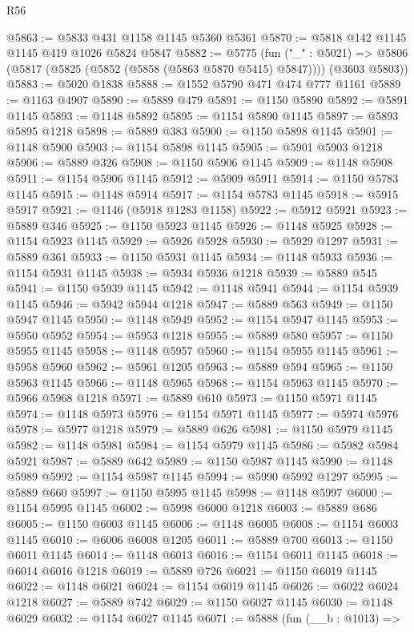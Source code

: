 \begin{lexlean}{R56}
\begin{coremodule}
@5863 := @5833 @431 @1158 @1145 @5360 @5361
@5870 := @5818 @142 @1145 @1145 @419 @1026 @5824 @5847
@5882 := @5775
    (fun ("_" : @5021) =>
    @5806 (@5817 (@5825 (@5852 (@5858 (@5863 @5870 @5415) @5847)))) (@3603 @5803))
@5883 := @5020 @1838
@5888 := @1552 @5790 @471 @474 @777 @1161
@5889 := @1163 @4907
@5890 := @5889 @479
@5891 := @1150 @5890
@5892 := @5891 @1145
@5893 := @1148 @5892
@5895 := @1154 @5890 @1145
@5897 := @5893 @5895 @1218
@5898 := @5889 @383
@5900 := @1150 @5898 @1145
@5901 := @1148 @5900
@5903 := @1154 @5898 @1145
@5905 := @5901 @5903 @1218
@5906 := @5889 @326
@5908 := @1150 @5906 @1145
@5909 := @1148 @5908
@5911 := @1154 @5906 @1145
@5912 := @5909 @5911
@5914 := @1150 @5783 @1145
@5915 := @1148 @5914
@5917 := @1154 @5783 @1145
@5918 := @5915 @5917
@5921 := @1146 (@5918 @1283 @1158)
@5922 := @5912 @5921
@5923 := @5889 @346
@5925 := @1150 @5923 @1145
@5926 := @1148 @5925
@5928 := @1154 @5923 @1145
@5929 := @5926 @5928
@5930 := @5929 @1297
@5931 := @5889 @361
@5933 := @1150 @5931 @1145
@5934 := @1148 @5933
@5936 := @1154 @5931 @1145
@5938 := @5934 @5936 @1218
@5939 := @5889 @545
@5941 := @1150 @5939 @1145
@5942 := @1148 @5941
@5944 := @1154 @5939 @1145
@5946 := @5942 @5944 @1218
@5947 := @5889 @563
@5949 := @1150 @5947 @1145
@5950 := @1148 @5949
@5952 := @1154 @5947 @1145
@5953 := @5950 @5952
@5954 := @5953 @1218
@5955 := @5889 @580
@5957 := @1150 @5955 @1145
@5958 := @1148 @5957
@5960 := @1154 @5955 @1145
@5961 := @5958 @5960
@5962 := @5961 @1205
@5963 := @5889 @594
@5965 := @1150 @5963 @1145
@5966 := @1148 @5965
@5968 := @1154 @5963 @1145
@5970 := @5966 @5968 @1218
@5971 := @5889 @610
@5973 := @1150 @5971 @1145
@5974 := @1148 @5973
@5976 := @1154 @5971 @1145
@5977 := @5974 @5976
@5978 := @5977 @1218
@5979 := @5889 @626
@5981 := @1150 @5979 @1145
@5982 := @1148 @5981
@5984 := @1154 @5979 @1145
@5986 := @5982 @5984 @5921
@5987 := @5889 @642
@5989 := @1150 @5987 @1145
@5990 := @1148 @5989
@5992 := @1154 @5987 @1145
@5994 := @5990 @5992 @1297
@5995 := @5889 @660
@5997 := @1150 @5995 @1145
@5998 := @1148 @5997
@6000 := @1154 @5995 @1145
@6002 := @5998 @6000 @1218
@6003 := @5889 @686
@6005 := @1150 @6003 @1145
@6006 := @1148 @6005
@6008 := @1154 @6003 @1145
@6010 := @6006 @6008 @1205
@6011 := @5889 @700
@6013 := @1150 @6011 @1145
@6014 := @1148 @6013
@6016 := @1154 @6011 @1145
@6018 := @6014 @6016 @1218
@6019 := @5889 @726
@6021 := @1150 @6019 @1145
@6022 := @1148 @6021
@6024 := @1154 @6019 @1145
@6026 := @6022 @6024 @1218
@6027 := @5889 @742
@6029 := @1150 @6027 @1145
@6030 := @1148 @6029
@6032 := @1154 @6027 @1145
@6071 := @5888
    (fun (__b : @1013) =>

\end{coremodule}
\end{lexlean}
